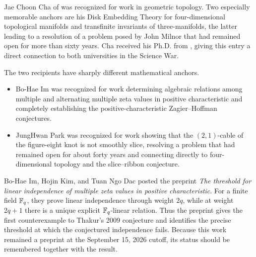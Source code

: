     \begin{fact}
        Jae Choon Cha of \POSTECH{} was recognized for work in geometric
        topology. Two especially memorable anchors are his Disk Embedding Theory
        for four-dimensional topological manifolds and transfinite invariants of
        three-manifolds, the latter leading to a resolution of a problem posed by
        John Milnor that had remained open for more than sixty years. Cha received
        his Ph.D. from \KAIST, giving this entry a direct connection to both
        universities in the Science War.
    \end{fact}

    \begin{fact}
        The two \KAIST{} recipients have sharply different mathematical anchors.
        \begin{itemize}
            \item Bo-Hae Im was recognized for work determining algebraic
                  relations among multiple and alternating multiple zeta values
                  in positive characteristic and completely establishing the
                  positive-characteristic Zagier--Hoffman conjectures.
            \item JungHwan Park was recognized for work showing that the
                  $(2,1)$-cable of the figure-eight knot is not smoothly slice,
                  resolving a problem that had remained open for about forty
                  years and connecting directly to four-dimensional topology and
                  the slice--ribbon conjecture.
        \end{itemize}
    \end{fact}

    \begin{fact}
        Bo-Hae Im, Hojin Kim, and Tuan Ngo Dac posted the preprint
        \textit{The threshold for linear independence of multiple zeta values in
        positive characteristic}. For a finite field $\mathbb{F}_q$, they prove linear
        independence through weight $2q$, while at weight $2q+1$ there is a
        unique explicit $\mathbb{F}_q$-linear relation. Thus the preprint gives the first
        counterexample to Thakur's 2009 conjecture and identifies the precise
        threshold at which the conjectured independence fails. Because this work
        remained a preprint at the September 15, 2026 cutoff, its
        status should be
        remembered together with the result.
    \end{fact}

